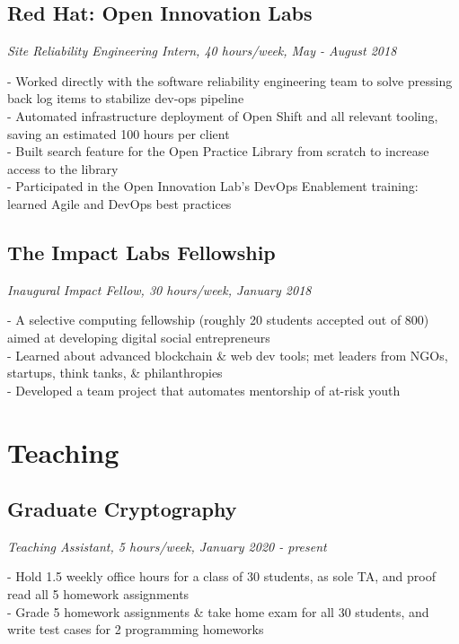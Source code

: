 \documentclass{article}
\begin{document}
\subsection{Red Hat: Open Innovation Labs} \hfill \textit{Site Reliability Engineering Intern, 40 hours/week, May - August 2018}

\noindent - Worked directly with the software reliability engineering team to solve pressing back log items to stabilize dev-ops pipeline \\
- Automated infrastructure deployment of Open Shift and all relevant tooling, saving an estimated 100 hours per client \\
- Built search feature for the Open Practice Library from scratch to increase access to the library \\
- Participated in the Open Innovation Lab’s DevOps Enablement training: learned Agile and DevOps best practices
\vspace{.15em}

\subsection{The Impact Labs Fellowship} \hfill \textit{Inaugural Impact Fellow, 30 hours/week, January 2018}

\noindent - A selective computing fellowship (roughly 20 students accepted out of 800) aimed at developing digital social entrepreneurs \\
- Learned about advanced blockchain \& web dev tools; met leaders from NGOs, startups, think tanks, \& philanthropies \\
- Developed a team project that automates mentorship of at-risk youth
\vspace{.05em}

\section{Teaching}
\vspace{.15em}

\subsection{Graduate Cryptography} \hfill \textit{Teaching Assistant, 5 hours/week, January 2020 - present}

\noindent - Hold 1.5 weekly office hours for a class of 30 students, as sole TA, and proof read all 5 homework assignments \\
- Grade 5 homework assignments \& take home exam for all 30 students, and write test cases for 2 programming homeworks
\end{document}
